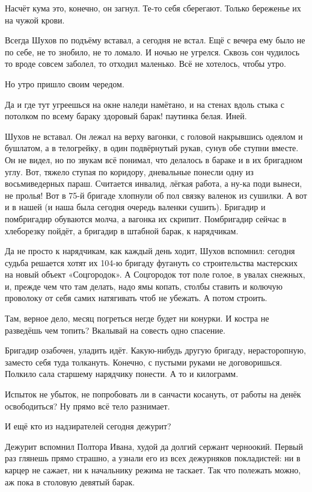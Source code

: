 Насчёт кума \dash это, конечно, он загнул. Те-то себя сберегают. Только береженье их \dash на чужой
крови.

Всегда Шухов по подъёму вставал, а сегодня не встал. Ещё с вечера ему было не по себе, не то
знобило, не то ломало. И ночью не угрелся. Сквозь сон чудилось \dash то вроде совсем заболел, то
отходил маленько. Всё не хотелось, чтобы утро.

Но утро пришло своим чередом.

Да и где тут угреешься \dash на окне наледи намётано, и на стенах вдоль стыка с потолком по всему
бараку \dash здоровый барак! \dash паутинка белая. Иней.

Шухов не вставал. Он лежал на верху вагонки, с головой накрывшись одеялом и бушлатом, а в
телогрейку, в один подвёрнутый рукав, сунув обе ступни вместе. Он не видел, но по звукам всё
понимал, что делалось в бараке и в их бригадном углу. Вот, тяжело ступая по коридору,
дневальные понесли одну из восьмиведерных параш. Считается инвалид, лёгкая работа, а ну-ка
поди вынеси, не пролья! Вот в 75-й бригаде хлопнули об пол связку валенок из сушилки. А вот \dash и
в нашей (и наша была сегодня очередь валенки сушить). Бригадир и помбригадир обуваются молча,
а вагонка их скрипит. Помбригадир сейчас в хлеборезку пойдёт, а бригадир \dash в штабной барак, к
нарядчикам.

Да не просто к нарядчикам, как каждый день ходит, \dash Шухов вспомнил: сегодня судьба решается
\dash хотят их 104-ю бригаду фугануть со строительства мастерских на новый объект «Соцгородок». А
Соцгородок тот \dash поле голое, в увалах снежных, и, прежде чем что там делать, надо ямы копать,
столбы ставить и колючую проволоку от себя самих натягивать \dash чтоб не убежать. А потом
строить.

Там, верное дело, месяц погреться негде будет \dash ни конурки. И костра не разведёшь \dash чем
топить? Вкалывай на совесть \dash одно спасение.

Бригадир озабочен, уладить идёт. Какую-нибудь другую бригаду, нерасторопную, заместо себя
туда толкануть. Конечно, с пустыми руками не договоришься. Полкило сала старшему нарядчику
понести. А то и килограмм.

Испыток не убыток, не попробовать ли в санчасти косануть, от работы на денёк освободиться? Ну
прямо всё тело разнимает.

И ещё \dash кто из надзирателей сегодня дежурит?

Дежурит \dash вспомнил \dash Полтора Ивана, худой да долгий сержант черноокий. Первый раз глянешь \dash
прямо страшно, а узнали его \dash из всех дежурняков покладистей: ни в карцер не сажает, ни к
начальнику режима не таскает. Так что полежать можно, аж пока в столовую девятый барак.

